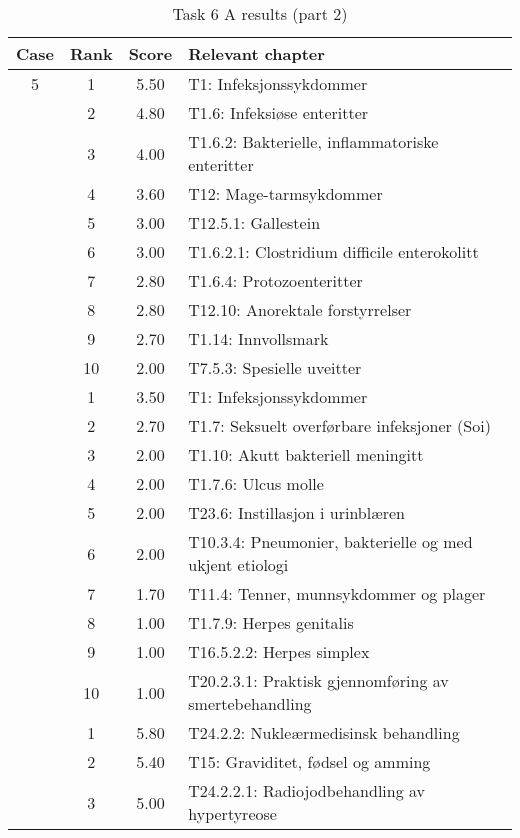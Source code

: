 \begin{table}[htbp] \footnotesize \center
\caption{Task 6 A results (part 2)\label{tab:task6a2}}
\begin{tabular}{c c c l}
    \toprule
    Case & Rank & Score & Relevant chapter \\
    \midrule
    5 & 1 & 5.50 & T1: Infeksjonssykdommer \\
     & 2 & 4.80 & T1.6: Infeksiøse enteritter \\
     & 3 & 4.00 & T1.6.2: Bakterielle, inflammatoriske enteritter \\
     & 4 & 3.60 & T12: Mage-tarmsykdommer \\
     & 5 & 3.00 & T12.5.1: Gallestein \\
     & 6 & 3.00 & T1.6.2.1: Clostridium difficile enterokolitt \\
     & 7 & 2.80 & T1.6.4: Protozoenteritter \\
     & 8 & 2.80 & T12.10: Anorektale forstyrrelser \\
     & 9 & 2.70 & T1.14: Innvollsmark \\
     & 10 & 2.00 & T7.5.3: Spesielle uveitter \\
	\addlinespace
    6 & 1 & 3.50 & T1: Infeksjonssykdommer \\
     & 2 & 2.70 & T1.7: Seksuelt overførbare infeksjoner (Soi) \\
     & 3 & 2.00 & T1.10: Akutt bakteriell meningitt \\
     & 4 & 2.00 & T1.7.6: Ulcus molle \\
     & 5 & 2.00 & T23.6: Instillasjon i urinblæren \\
     & 6 & 2.00 & T10.3.4: Pneumonier, bakterielle og med ukjent etiologi \\
     & 7 & 1.70 & T11.4: Tenner, munnsykdommer og plager \\
     & 8 & 1.00 & T1.7.9: Herpes genitalis \\
     & 9 & 1.00 & T16.5.2.2: Herpes simplex \\
     & 10 & 1.00 & T20.2.3.1: Praktisk gjennomføring av smertebehandling \\%
	\addlinespace
    7 & 1 & 5.80 & T24.2.2: Nukleærmedisinsk behandling \\
     & 2 & 5.40 & T15: Graviditet, fødsel og amming \\
     & 3 & 5.00 & T24.2.2.1: Radiojodbehandling av hypertyreose \\

\end{tabular}
\end{table}
